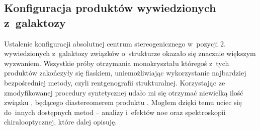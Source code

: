 \subsection{Konfiguracja produktów wywiedzionych z~galaktozy}
Ustalenie konfiguracji absolutnej centrum stereogenicznego w~pozycji 2. wywiedzionych
  z~galaktozy związków o~strukturze  okazało się znacznie większym wyzwaniem.
Wszystkie próby otrzymania monokryształu któregoś z~tych produktów zakończyły się fiaskiem,
  uniemożliwiając wykorzystanie najbardziej bezpośredniej metody,
  czyli rentgenografii strukturalnej.
Korzystając ze zmodyfikowanej procedury syntetycznej udało mi się otrzymać niewielką ilość
  związku , będącego diastereomerem produktu .
Mogłem dzięki temu uciec się do~innych dostępnych metod \--- analizy \NMR*{} i~efektów \gls{noe}
  oraz spektroskopii chiralooptycznej, które dalej opisuję.

